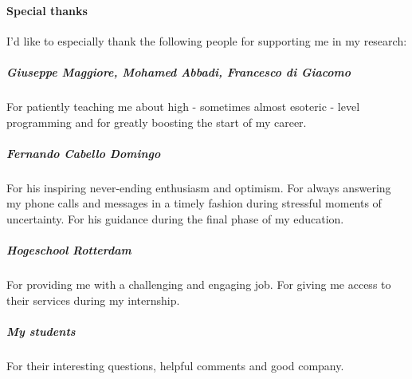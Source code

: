 \documentclass{article}
\begin{document}
\paragraph{Special thanks}
I'd like to especially thank the following people for supporting me in my research:

\subparagraph{Giuseppe Maggiore, Mohamed Abbadi, Francesco di Giacomo}
For patiently teaching me about high - sometimes almost esoteric - level programming and for greatly boosting the start of my
career.

\subparagraph{Fernando Cabello Domingo}
For his inspiring never-ending enthusiasm and optimism. For always answering my phone calls and messages in a timely fashion
during stressful moments of uncertainty. For his guidance during the final phase of my education.

\subparagraph{Hogeschool Rotterdam}
For providing me with a challenging and engaging job. For giving me access to their services during my internship.

\subparagraph{My students}
For their interesting questions, helpful comments and good company.


\newpage


\printbibliography[heading=bibintoc]
\end{document}
